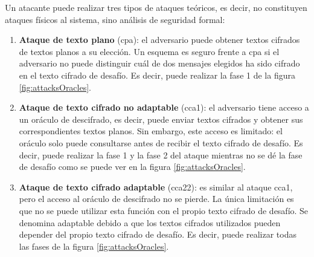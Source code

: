 Un atacante puede realizar tres tipos de ataques teóricos, es decir, no constituyen ataques físicos al sistema, sino análisis de seguridad formal:
\begin{enumerate}
	\item \textbf{Ataque de texto plano} (\acrshort{cpa}): el adversario puede obtener textos cifrados de textos planos a su elección. Un esquema es seguro frente a \acrshort{cpa} si el adversario no puede distinguir cuál de dos mensajes elegidos ha sido cifrado en el texto cifrado de desafío. Es decir, puede realizar la fase 1 de la figura \ref{fig:attacksOracles}.
	\item \textbf{Ataque de texto cifrado no adaptable} (\acrshort{cca1}): el adversario tiene acceso a un oráculo de descifrado, es decir, puede enviar textos cifrados y obtener sus correspondientes textos planos. Sin embargo, este acceso es limitado: el oráculo solo puede consultarse antes de recibir el texto cifrado de desafío. Es decir, puede realizar la fase 1 y la fase 2 del ataque mientras no se dé la fase de desafío como se puede ver en la figura \ref{fig:attacksOracles}.
	\item \textbf{Ataque de texto cifrado adaptable} (\acrshort{cca22}): es similar al ataque \acrshort{cca1}, pero el acceso al oráculo de descifrado no se pierde. La única limitación es que no se puede utilizar esta función con el propio texto cifrado de desafío. Se denomina adaptable debido a que los textos cifrados utilizados pueden depender del propio texto cifrado de desafío. Es decir, puede realizar todas las fases de la figura \ref{fig:attacksOracles}.
\end{enumerate}
\newline


